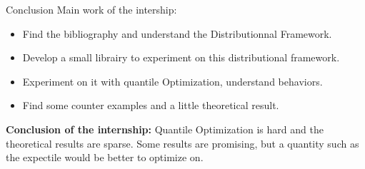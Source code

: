 \documentclass[10pt]{beamer}
\begin{document}
\begin{frame}{Conclusion}
    Main work of the intership:
    \begin{itemize}
        \item Find the bibliography and understand the Distributionnal Framework.
        \item Develop a small librairy to experiment on this distributional framework.
        \item Experiment on it with quantile Optimization, understand behaviors.
        \item Find some counter examples and a little theoretical result.
    \end{itemize}

\bigskip

\textbf{Conclusion of the internship:} Quantile Optimization is hard and the theoretical results are sparse. Some results are promising, but a quantity such as the expectile would be better to optimize on.
\end{frame}

\begin{frame}
    \tiny
    \nocite{*}
     

\end{frame}
\end{document}
